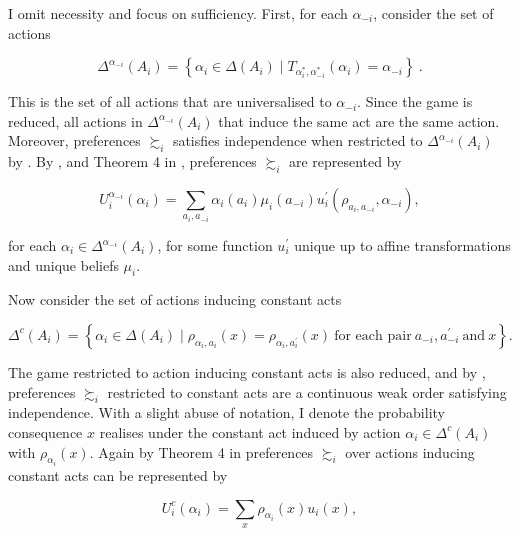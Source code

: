\begin{linproof}
	I omit necessity and focus on sufficiency. First, for each \( \alpha_{-i} \), consider the set of actions

	\[ \Delta^{\alpha_{-i}} \left(A_i \right) = \left\{ \alpha_i \in \Delta \left(A_i\right) \mid T_{\alpha^{*}_i, \alpha^{*}_{-i}} \left( \alpha_i \right) = \alpha_{-i} \right\} \: .\]

	This is the set of all actions that are universalised to \( \alpha_{-i} \). Since the game is reduced, all actions in \( \Delta^{\alpha_{-i}} \left(A_i \right) \) that induce the same act are the same action. Moreover, preferences \( \succsim_i \) satisfies independence when restricted to \( \Delta^{\alpha_{-i}} \left(A_i \right) \) by . By ,  and Theorem 4 in \cite{battigalliMixedExtensionsDecision2017}, preferences \( \succsim_i \) are represented by

	\begin{equation}\label{eq:univ}
		U^{\alpha_{-i}}_i \left( \alpha_i \right) = \sum_{a_i, a_{-i}} \alpha_i(a_i) \mu_{i}(a_{-i}) u^{\prime}_i(\rho_{a_i, a_{-i}}, \alpha_{-i}),
	\end{equation}

	for each \( \alpha_i \in \Delta^{\alpha_{-i}} \left(A_i \right) \), for some function \( u^{\prime}_i \) unique up to affine transformations and unique beliefs \( \mu_i \).

	Now consider the set of actions inducing constant acts

	\[ \Delta^{c} \left(A_i \right) = \left\{ \alpha_i \in \Delta \left(A_i\right) \mid \rho_{\alpha_i,a_{i}} (x) = \rho_{\alpha_i,a^{\prime}_{i}} (x) \: \text{for each pair} \: a_{-i},a_{-i}^{\prime} \: \text{and} \: x \right\}. \]

	The game restricted to action inducing constant acts is also reduced, and by , preferences \( \succsim_i \) restricted to constant acts are a continuous weak order satisfying independence. With a slight abuse of notation, I denote the probability consequence \( x \) realises under the constant act induced by action \( \alpha_i \in \Delta^{c} \left(A_i \right) \) with \( \rho_{\alpha_i} (x) \). Again by Theorem 4 in \cite{battigalliMixedExtensionsDecision2017} preferences \( \succsim_i \) over actions inducing constant acts can be represented by

	\begin{equation}\label{eq:const}
		U^c_i \left( \alpha_i \right) = \sum_{x} \rho_{\alpha_i}\left( x\right) u_i \left(x\right),
	\end{equation}


\end{linproof}
